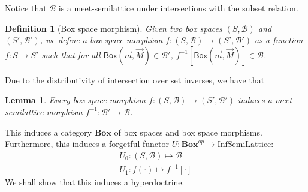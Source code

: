 \documentclass[12pt]{article}
\newtheorem{lemma}[theorem]{Lemma}
\newtheorem{definition}[theorem]{Definition}
\newtheorem{remark}[theorem]{Remark}
\newcommand{\InfSemiLattice}{\text{InfSemiLattice}}
\newcommand{\bobject}{\mathsf{Box}}
\begin{document}
Notice that $\mathcal{B}$ is a meet-semilattice under intersections with the subset relation. 
\begin{definition}[Box space morphism]
    Given two box spaces $(S,\mathcal{B})$ and $(S',\mathcal{B}')$,
    we define a box space morphism $f:(S,\mathcal{B})\to(S',\mathcal{B}')$ as a function
    $f:S\to S'$ such that for all $\bobject(\vec{m},\vec{M})\in\mathcal{B}'$,
    $f^{-1}[\bobject(\vec{m},\vec{M})]\in\mathcal{B}$.
\end{definition}
Due to the distributivity of intersection over set inverses, we have that
\begin{lemma}
    Every box space morphism 
    $f:(S,\mathcal{B})\to(S',\mathcal{B}')$ induces a
    meet-semilattice morphism $f^{-1}:\mathcal{B}'\to\mathcal{B}$.
\end{lemma}
This induces a category $\mathbf{Box}$ of box spaces and box space morphisms.
Furthermore, this induces a forgetful functor $U:\mathbf{Box}^{op}\to\InfSemiLattice$:
\begin{gather*}
    U_0:(S,\mathcal{B})\mapsto\mathcal{B}
    \\
    U_1:f(\cdot)\mapsto f^{-1}[\cdot]
\end{gather*}
We shall show that this induces a hyperdoctrine.
\end{document}
